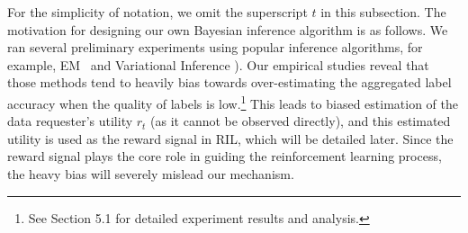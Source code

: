 \documentclass{article}
\newcommand{\com}[1]{\textbf{\color{red}(COMMENT: #1)}} %
\newcommand{\com}[1]{}
\begin{document}
For the simplicity of notation, we omit the superscript $t$ in this subsection. The motivation for designing our own Bayesian inference algorithm is as follows. We ran several preliminary experiments using popular inference algorithms, for example, EM~\cite{dawid1979maximum,raykar2010learning,zhang2014spectral} and Variational Inference \cite{liu2012variational,chen2015statistical}). Our empirical studies reveal that those methods tend to heavily bias towards over-estimating the aggregated label accuracy when the quality of labels is low.\footnote{See Section 5.1 for detailed experiment results and analysis.}
This leads to biased estimation of the data requester's utility $r_t$ (as it cannot be observed directly), and this estimated utility is used as the reward signal in RIL, which will be detailed later.
Since the reward signal plays the core role in guiding the reinforcement learning process, the heavy bias will severely mislead our mechanism.
\end{document}
